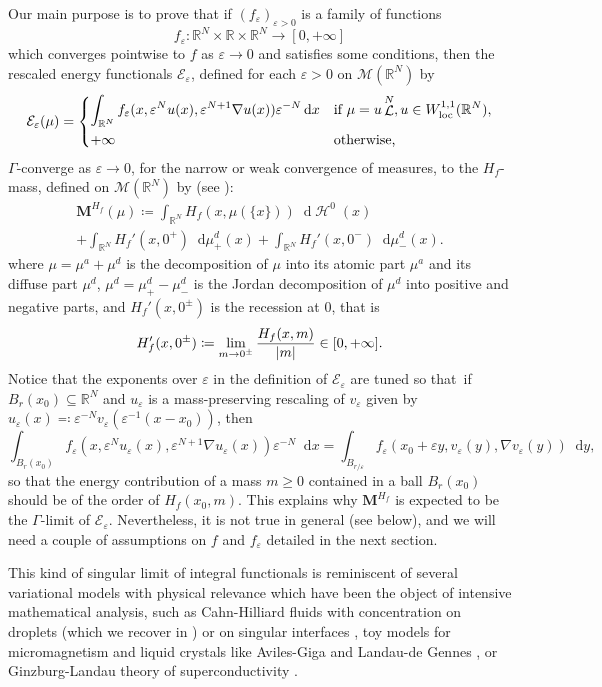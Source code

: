 \documentclass[JEP,XML,SOM,Unicode,published]{cedram}
\theoremstyle{plain}
\theoremstyle{definition}
\newcommand{\dd}{\mathop{}\mathopen{}\mathrm{d}}
\newcommand{\R}{\mathbb{R}}
\newcommand{\Mspace}{\mathscr{M}}
\newcommand{\ener}{\mathcal{E}}
\newcommand{\mass}{\boldsymbol{M}}
\newcommand{\loc}{\mathrm{loc}}
\newcommand{\eps}{\varepsilon}
\DeclarePairedDelimiter{\abs}{\lvert}{\rvert}
\DeclareMathOperator{\hdm}{\mathcal{H}}
\DeclareMathOperator{\lbm}{\mathcal{L}}
\begin{document}
Our main purpose is to prove that if $(f_\eps)_{\eps > 0}$ is a family of functions
\[
f_\eps:\R^N\times\R\times\R^N\to[0,+\infty]
\]
which converges pointwise to \(f\) as \(\eps\to 0\) and satisfies some conditions, then the rescaled energy functionals \(\ener_\eps\), defined for each \(\eps>0\) on \(\Mspace(\R^N)\) by
\begin{equation}
\label{mainEnergyEpsilon}
\ener_\eps(\mu)=
\begin{dcases}
\int_{\R^N} f_\eps(x,\eps^N u(x), \eps^{N+1} \nabla u(x)) \eps^{-N} \dd x &\text{if }\mu = u\lbm^N, u\in W^{1,1}_\loc(\R^N),\\
+\infty&\text{otherwise,}
\end{dcases}
\end{equation}
\(\Gamma\)-converge as \(\eps\to 0\), for the narrow or weak convergence of measures, to the \(H_f\)-mass, defined on \(\Mspace(\R^N)\) by (see ):
\begin{multline*}
\mass^{H_f}(\mu) \coloneqq \int_{\R^N} H_f(x,\mu(\{x\}))\dd\hdm^0(x)\\
+\int_{\R^N} H_f'(x,0^+) \dd \mu^d_+(x) + \int_{\R^N} H_f'(x,0^-) \dd \mu^d_-(x).
\end{multline*}
where \(\mu = \mu^a+\mu^d\) is the decomposition of $\mu$ into its atomic part $\mu^a$ and its diffuse part $\mu^d$, $\mu^d = \mu^d_+ - \mu^d_-$ is the Jordan decomposition of $\mu^d$ into positive and negative parts, and $H_f'(x,0^\pm)$ is the recession at $0$, that is
\[H_f'(x,0^\pm) \coloneqq \lim_{m\to 0^\pm}\frac{H_f(x,m)}{\abs{m}}\in [0,+\infty].\]
Notice that the exponents over $\eps$ in the definition of $\ener_\eps$ are tuned so that~if~\hbox{\(B_r(x_0) \!\subseteq\!\R^N\)} and $u_\eps$ is a mass-preserving rescaling of $v_\eps$ given by $u_\eps(x) \eqqcolon \eps^{-N} v_\eps(\eps^{-1}(x-x_0))$, then
\[
\int_{B_r(x_0)} f_\eps(x,\eps^N u_\eps(x), \eps^{N+1} \nabla u_\eps(x)) \eps^{-N} \dd x = \int_{B_{r/\eps}} f_\eps(x_0+\eps y,v_\eps(y), \nabla v_\eps(y)) \dd y,
\]
so that the energy contribution of a mass \(m\geq 0\) contained in a ball \(B_r(x_0)\) should be of the order of \(H_f(x_0,m)\). This explains why \(\mass^{H_f}\) is expected to be the \(\Gamma\)-limit of \(\ener_\eps\). Nevertheless, it is not true in general (see  below), and we will need a couple of assumptions on \(f\) and \(f_\eps\) detailed in the next section.

This kind of singular limit of integral functionals is reminiscent of several variational models with physical relevance which have been the object of intensive mathematical analysis, such as Cahn-Hilliard fluids with concentration on droplets \cite{bouchitteTransitionsPhasesAvec1996} (which we recover in ) or on singular interfaces \cite{modicaEsempioDiGamma1977}, toy models for micromagnetism and liquid crystals like Aviles-Giga \cite{avilesLowerSemicontinuityDefect1999} and Landau-de Gennes \cite{baumanAnalysisNematicLiquid2012}, or Ginzburg-Landau theory of superconductivity \cite{bethuelGinzburgLandauVortices2017}.
\end{document}
